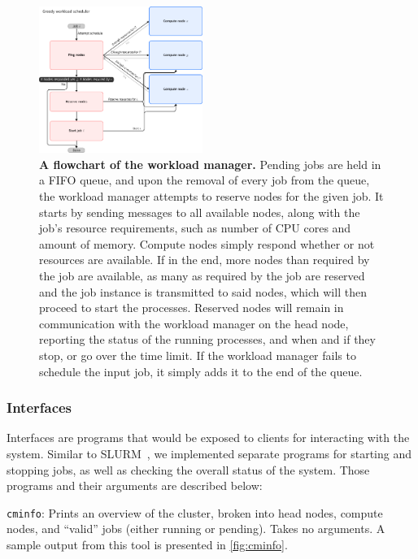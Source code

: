 \documentclass[sigconf]{acmart}
\begin{document}
\begin{figure}[ht]
    \centering
    \includegraphics[width=0.475\textwidth]{figures/wlm.pdf}
    \caption{
        \textbf{A flowchart of the workload manager.}
        Pending jobs are held in a FIFO queue, and upon the removal of every job from the queue, the workload manager attempts
        to reserve nodes for the given job. It starts by sending messages to all available nodes, along with the job's resource
        requirements, such as number of CPU cores and amount of memory. Compute nodes simply respond whether or not resources
        are available. If in the end, more nodes than required by the job are available, as many as required by the job are
        reserved and the job instance is transmitted to said nodes, which will then proceed to start the processes.
        Reserved nodes will remain in communication with the workload manager on the head node, reporting the status of the
        running processes, and when and if they stop, or go over the time limit.
        If the workload manager fails to schedule the input job, it simply adds it to the end of the queue.
    }
    \label{fig:wlm}
\end{figure}

\subsubsection{Interfaces}
Interfaces are programs that would be exposed to clients for interacting with the system.
Similar to SLURM~\cite{yoo2003slurm}, we implemented separate programs for starting and stopping jobs, as well as checking the
overall status of the system.
Those programs and their arguments are described below:

\verb|cminfo|: Prints an overview of the cluster, broken into head nodes, compute nodes, and ``valid''
jobs (either running or pending). Takes no arguments. A sample output from this tool is presented in \cref{fig:cminfo}.
\end{document}
